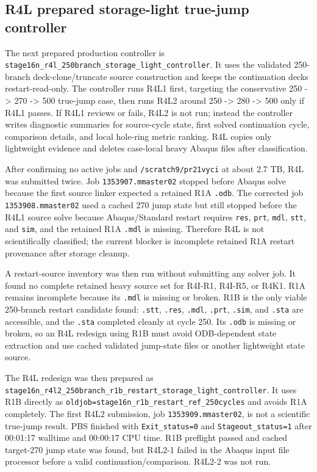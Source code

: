 \documentclass{article}
\begin{document}
\subsection*{R4L prepared storage-light true-jump controller}
The next prepared production controller is \texttt{stage16n\_r4l\_250branch\_storage\_light\_controller}. It uses the validated 250-branch deck-clone/truncate source construction and keeps the continuation decks restart-read-only. The controller runs R4L1 first, targeting the conservative 250 -> 270 -> 500 true-jump case, then runs R4L2 around 250 -> 280 -> 500 only if R4L1 passes. If R4L1 reviews or fails, R4L2 is not run; instead the controller writes diagnostic summaries for source-cycle state, first solved continuation cycle, comparison details, and local hole-ring metric ranking. R4L copies only lightweight evidence and deletes case-local heavy Abaqus files after classification.

After confirming no active jobs and \texttt{/scratch9/pr21vyci} at about 2.7 TB, R4L was submitted twice. Job \texttt{1353907.mmaster02} stopped before Abaqus solve because the first source linker expected a retained R1A \texttt{.odb}. The corrected job \texttt{1353908.mmaster02} used a cached 270 jump state but still stopped before the R4L1 source solve because Abaqus/Standard restart requires \texttt{res}, \texttt{prt}, \texttt{mdl}, \texttt{stt}, and \texttt{sim}, and the retained R1A \texttt{.mdl} is missing. Therefore R4L is not scientifically classified; the current blocker is incomplete retained R1A restart provenance after storage cleanup.

A restart-source inventory was then run without submitting any solver job. It found no complete retained heavy source set for R4I-R1, R4I-R5, or R4K1. R1A remains incomplete because its \texttt{.mdl} is missing or broken. R1B is the only viable 250-branch restart candidate found: \texttt{.stt}, \texttt{.res}, \texttt{.mdl}, \texttt{.prt}, \texttt{.sim}, and \texttt{.sta} are accessible, and the \texttt{.sta} completed cleanly at cycle 250. Its \texttt{.odb} is missing or broken, so an R4L redesign using R1B must avoid ODB-dependent state extraction and use cached validated jump-state files or another lightweight state source.

The R4L redesign was then prepared as \texttt{stage16n\_r4l2\_250branch\_r1b\_restart\_storage\_light\_controller}. It uses R1B directly as \texttt{oldjob=stage16n\_r1b\_restart\_ref\_250cycles} and avoids R1A completely. The first R4L2 submission, job \texttt{1353909.mmaster02}, is not a scientific true-jump result. PBS finished with \texttt{Exit\_status=0} and \texttt{Stageout\_status=1} after 00:01:17 walltime and 00:00:17 CPU time. R1B preflight passed and cached target-270 jump state was found, but R4L2-1 failed in the Abaqus input file processor before a valid continuation/comparison. R4L2-2 was not run.
\end{document}
